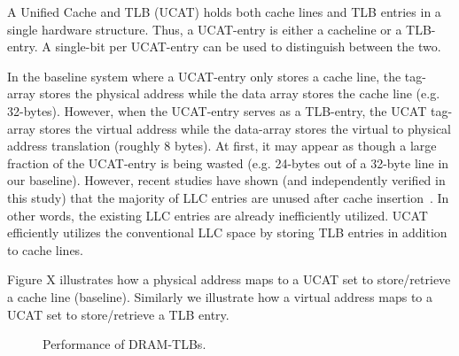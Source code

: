 \noindent A Unified Cache and TLB (UCAT) holds both cache lines and
TLB entries in a single hardware structure. Thus, a UCAT-entry is
either a cacheline or a TLB-entry. A single-bit per UCAT-entry can be
used to distinguish between the two.

In the baseline system where a UCAT-entry only stores a cache line,
the tag-array stores the physical address while the data array stores
the cache line (e.g. 32-bytes). However, when the UCAT-entry serves as
a TLB-entry, the UCAT tag-array stores the virtual address while the
data-array stores the virtual to physical address translation (roughly
8 bytes). At first, it may appear as though a large fraction of the
UCAT-entry is being wasted (e.g. 24-bytes out of a 32-byte line in our
baseline). However, recent studies have shown (and independently
verified in this study) that the majority of LLC entries are unused
after cache insertion~\cite{}. In other words, the existing LLC
entries are already inefficiently utilized. UCAT efficiently utilizes
the conventional LLC space by storing TLB entries in addition to cache
lines.

Figure X illustrates how a physical address maps to a UCAT set to
store/retrieve a cache line (baseline). Similarly we illustrate how a
virtual address maps to a UCAT set to store/retrieve a TLB entry.

% 
% 

\begin{figure}[tp] 
  \vspace{-0.in} \centering
  \centerline{}

  \caption{\small Performance of DRAM-TLBs. \normalsize}
  \label{fig:perf_UCAT} 
  \vspace{0.2 in}
\end{figure}

